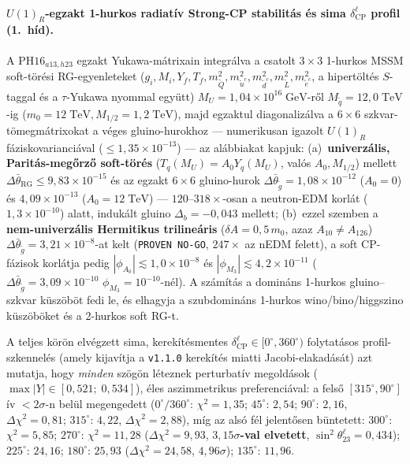 \documentclass[11pt,a4paper]{article}
\begin{document}
\paragraph{$U(1)_R$-egzakt 1-hurkos radiatív Strong-CP stabilitás és sima $\delta_{\mathrm{CP}}^\ell$ profil (1.~híd).}
A $\mathrm{PH16}_{a13,h23}$ egzakt Yukawa-mátrixain integrálva a csatolt $3\times 3$ 1-hurkos MSSM soft-törési RG-egyenleteket ($g_i, M_i, Y_f, T_f, m_{\tilde Q}^2, m_{\tilde u^c}^2, m_{\tilde d^c}^2, m_{\tilde L}^2, m_{\tilde e^c}^2$, a hipertöltés $S$-taggal és a $\tau$-Yukawa nyommal együtt) $M_U = 1{,}04\times 10^{16}\;\mathrm{GeV}$-ről $M_{\tilde q} = 12{,}0\;\mathrm{TeV}$-ig ($m_0 = 12\;\mathrm{TeV}, M_{1/2} = 1{,}2\;\mathrm{TeV}$), majd egzaktul diagonalizálva a $6\times 6$ szkvar-tömegmátrixokat a véges gluino-hurokhoz --- numerikusan igazolt $U(1)_R$ fáziskovarianciával ($\le 1{,}35\times 10^{-13}$) --- az alábbiakat kapjuk:
(a)~\textbf{univerzális, Paritás-megőrző soft-törés} ($T_q(M_U) = A_0 Y_q(M_U)$, valós $A_0, M_{1/2}$) mellett $\Delta\bar\theta_{\mathrm{RG}} \le 9{,}83\times 10^{-15}$ és az egzakt $6\times 6$ gluino-hurok $\Delta\bar\theta_{\tilde g} = 1{,}08\times 10^{-12}$ ($A_0 = 0$) és $4{,}09\times 10^{-13}$ ($A_0 = 12\;\mathrm{TeV}$) --- $120\text{--}318\times$-osan a neutron-EDM korlát ($1{,}3\times 10^{-10}$) alatt, indukált gluino $\Delta_b = -0{,}043$ mellett;
(b)~ezzel szemben a \textbf{nem-univerzális Hermitikus trilineáris} ($\delta A = 0{,}5\,m_0$, azaz $A_{10}\neq A_{126}$) $\Delta\bar\theta_{\tilde g} = 3{,}21\times 10^{-8}$-at kelt (\texttt{PROVEN NO-GO}, $247\times$ az nEDM felett), a soft CP-fázisok korlátja pedig $|\phi_{A_0}| \lesssim 1{,}0\times 10^{-8}$ és $|\phi_{M_3}| \lesssim 4{,}2\times 10^{-11}$ ($\Delta\bar\theta_{\tilde g} = 3{,}09\times 10^{-10}$ $\phi_{M_3}=10^{-10}$-nél). A számítás a domináns 1-hurkos gluino--szkvar küszöböt fedi le, és elhagyja a szubdomináns 1-hurkos wino/bino/higgszino küszöböket és a 2-hurkos soft RG-t.

A teljes körön elvégzett sima, kerekítésmentes $\delta_{\mathrm{CP}}^\ell \in [0^\circ, 360^\circ)$ folytatásos profil-szkennelés (amely kijavítja a \texttt{v1.1.0} kerekítés miatti Jacobi-elakadását) azt mutatja, hogy \emph{minden} szögön léteznek perturbatív megoldások ($\max|Y| \in [0{,}521;\; 0{,}534]$), éles aszimmetrikus preferenciával: a felső $[315^\circ, 90^\circ]$ ív $<2\sigma$-n belül megengedett ($0^\circ/360^\circ$: $\chi^2 = 1{,}35$; $45^\circ$: $2{,}54$; $90^\circ$: $2{,}16$, $\Delta\chi^2 = 0{,}81$; $315^\circ$: $4{,}22$, $\Delta\chi^2 = 2{,}88$), míg az alsó fél jelentősen büntetett: $300^\circ$: $\chi^2 = 5{,}85$; $270^\circ$: $\chi^2 = 11{,}28$ ($\Delta\chi^2 = 9{,}93$, \textbf{$3{,}15\sigma$-val elvetett}, $\sin^2\theta_{23}^\ell = 0{,}434$); $225^\circ$: $24{,}16$; $180^\circ$: $25{,}93$ ($\Delta\chi^2 = 24{,}58$, $4{,}96\sigma$); $135^\circ$: $11{,}96$.
\end{document}
